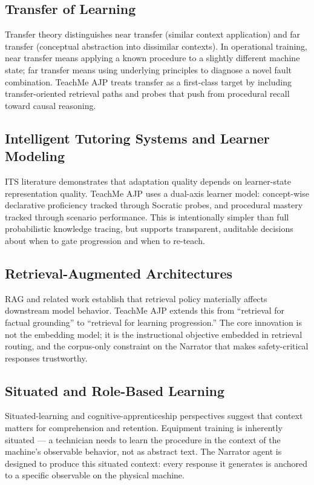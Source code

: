 \documentclass[10pt,letterpaper,twocolumn]{article}
\begin{document}
\subsection{Transfer of Learning}
Transfer theory distinguishes near transfer (similar context application) and far transfer (conceptual abstraction into dissimilar contexts). In operational training, near transfer means applying a known procedure to a slightly different machine state; far transfer means using underlying principles to diagnose a novel fault combination. TeachMe AJP treats transfer as a first-class target by including transfer-oriented retrieval paths and probes that push from procedural recall toward causal reasoning.

\subsection{Intelligent Tutoring Systems and Learner Modeling}
ITS literature demonstrates that adaptation quality depends on learner-state representation quality. TeachMe AJP uses a dual-axis learner model: concept-wise declarative proficiency tracked through Socratic probes, and procedural mastery tracked through scenario performance. This is intentionally simpler than full probabilistic knowledge tracing, but supports transparent, auditable decisions about when to gate progression and when to re-teach.

\subsection{Retrieval-Augmented Architectures}
RAG and related work establish that retrieval policy materially affects downstream model behavior. TeachMe AJP extends this from ``retrieval for factual grounding'' to ``retrieval for learning progression.'' The core innovation is not the embedding model; it is the instructional objective embedded in retrieval routing, and the corpus-only constraint on the Narrator that makes safety-critical responses trustworthy.

\subsection{Situated and Role-Based Learning}
Situated-learning and cognitive-apprenticeship perspectives suggest that context matters for comprehension and retention. Equipment training is inherently situated --- a technician needs to learn the procedure in the context of the machine's observable behavior, not as abstract text. The Narrator agent is designed to produce this situated context: every response it generates is anchored to a specific observable on the physical machine.
\end{document}
